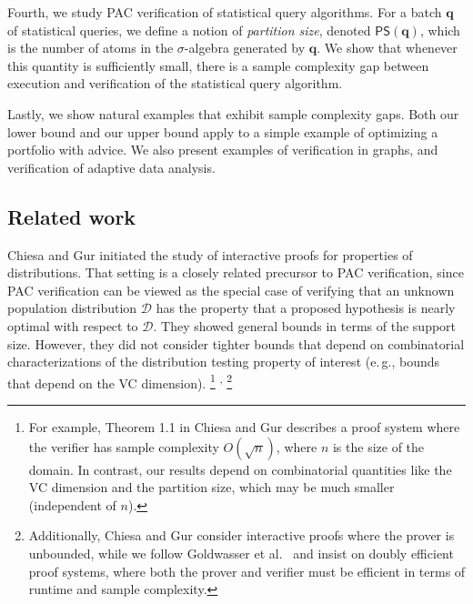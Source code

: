 \documentclass[11pt]{article}
\numberwithin{equation}{section}
\theoremstyle{definition}
\theoremstyle{plain}
\newcommand{\eg}{e.\,g.}
\theoremstyle{definition}\newtheorem{notation}[theorem]{Notation}\theoremstyle{plain}\raggedbottom
\newcommand{\roundBrackets}[1]{
	\mathopen{}\left(#1\right)\mathclose{}
}
\newcommand{\customFunctionRound}[2]{
	#1\roundBrackets{#2}
}
\newcommand{\sfFunction}[2]{
	\customFunctionRound{\mathsf{#1}}{#2}
}
\newcommand{\BigO}[1]{O\roundBrackets{#1}}
\newcommand{\cD}{\mathcal{D}}
\newcommand{\bq}{\mathbf{q}}
\newcommand{\1}{\mathds{1}}
\newcommand{\partitionSize}[1]{\sfFunction{PS}{#1}}
\begin{document}
Fourth, we study PAC verification of statistical query algorithms. For a batch $\bq$ of statistical queries, we define a notion of \emph{partition size}, denoted $\partitionSize{\bq}$, which is the number of atoms in the $\sigma$-algebra generated by $\bq$. We show that whenever this quantity is sufficiently small, there is a sample complexity gap between execution and verification of the statistical query algorithm. 

Lastly, we show natural examples that exhibit sample complexity gaps. Both our lower bound and our upper bound apply to a simple example of optimizing a portfolio with advice. We also present examples of verification in graphs, and verification of adaptive data analysis. 


%
\subsection{Related work}  %

Chiesa and Gur \cite{ChiesaG18} initiated the study of interactive proofs for properties of distributions. That setting is a closely related precursor to PAC verification, since PAC verification can be viewed as the special case of verifying that an unknown population distribution $\cD$ has the property that a proposed hypothesis is nearly optimal with respect to $\cD$.
They showed general bounds in terms of the support size. However, they did not consider tighter bounds that depend on combinatorial characterizations of the distribution testing property of interest (\eg, bounds that depend on the VC dimension).%
\footnote{
	For example, Theorem 1.1 in Chiesa and Gur \cite{ChiesaG18} describes a proof system where the verifier has sample complexity $\BigO{\sqrt{n}}$, where $n$ is the size of the domain. In contrast, our results depend on combinatorial quantities like the VC dimension and the partition size, which may be much smaller (independent of $n$).
}%
\textsuperscript{,}%
\footnote{
	Additionally, Chiesa and Gur \cite{ChiesaG18} consider interactive proofs where the prover is unbounded, while we follow Goldwasser et al.\ \cite{GoldwasserRSY21} and insist on doubly efficient proof systems, where both the prover and verifier must be efficient in terms of runtime and sample complexity.
}
\end{document}
